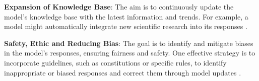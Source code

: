 \documentclass[sn-basic, Numbered]{sn-jnl}%
\theoremstyle{thmstyleone}%
\theoremstyle{thmstyletwo}%
\theoremstyle{thmstylethree}%
\begin{document}
\noindent\textbf{Expansion of Knowledge Base}: The aim is to continuously update the model's knowledge base with the latest information and trends. For example, a model might automatically integrate new scientific research into its responses \cite{wu2024continual}.

\noindent\textbf{Safety, Ethic and Reducing Bias}: The goal is to identify and mitigate biases in the model's responses, ensuring fairness and safety. One effective strategy is to incorporate guidelines, such as constitutions or specific rules, to identify inappropriate or biased responses and correct them through model updates \cite{bai2022constitutional, lu2024sofa}.






\end{document}
